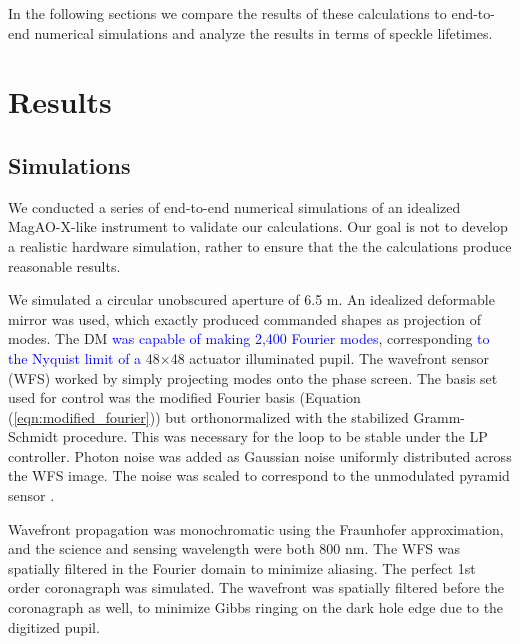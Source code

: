 \documentclass[10pt,preprint]{aastex631}
\newcommand{\jrmadd}[1]{\textcolor{blue}{#1}}
\begin{document}
In the following sections we compare the results of these calculations to end-to-end numerical simulations and analyze the results in terms of speckle lifetimes.

\afterpage{\clearpage}



\section{Results}
\label{sec:results}


\subsection{Simulations}
\label{sec:simulations}
We conducted a series of end-to-end numerical simulations of an idealized MagAO-X-like instrument to validate our calculations.  Our goal is not to develop a realistic hardware simulation, rather to ensure that the the calculations produce reasonable results. 

We simulated a circular unobscured aperture of 6.5 m.   An idealized deformable mirror was used, which exactly produced commanded shapes as projection of modes.  The DM \jrmadd{was capable of making 2,400 Fourier modes}, corresponding \jrmadd{to the Nyquist limit of a} 48$\times$48 actuator illuminated pupil.  The wavefront sensor (WFS) worked by simply projecting modes onto the phase screen.  The basis set used for control was the modified Fourier basis (Equation (\ref{eqn:modified_fourier})) but orthonormalized with the stabilized Gramm-Schmidt procedure.  This was necessary for the loop to be stable under the LP controller.  Photon noise was added as Gaussian noise uniformly distributed across the WFS image.  The noise was scaled to correspond to the unmodulated pyramid sensor  \cite[$\beta_p = \sqrt{2}$,][]{2005ApJ...629..592G}.

Wavefront propagation was monochromatic using the Fraunhofer approximation, and the science and sensing wavelength were both 800 nm.  The WFS was spatially filtered in the Fourier domain to minimize aliasing.  The perfect 1st order coronagraph was simulated.  The wavefront was spatially filtered before the coronagraph as well, to minimize Gibbs ringing on the dark hole edge due to the digitized pupil.
\end{document}
